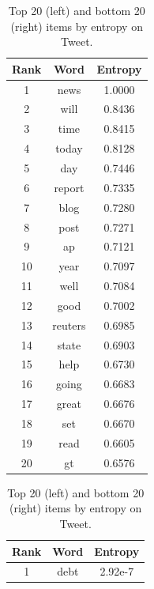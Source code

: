 \begin{table}[htbp]
\caption{Top 20 (left) and bottom 20 (right) items by entropy on Tweet.}
\begin{minipage}{0.45\linewidth}
    \centering
    \renewcommand{\arraystretch}{1.1} %
    \setlength{\tabcolsep}{7pt} %
    \label{tab:top20}
    \begin{tabular}{ccc}
    \toprule
    \textbf{Rank} & \textbf{Word} & \textbf{Entropy} \\
    \midrule
    1  & news     & 1.0000 \\
    2  & will     & 0.8436 \\
    3  & time     & 0.8415 \\
    4  & today    & 0.8128 \\
    5  & day      & 0.7446 \\
    6  & report   & 0.7335 \\
    7  & blog     & 0.7280 \\
    8  & post     & 0.7271 \\
    9  & ap       & 0.7121 \\
    10 & year     & 0.7097 \\
    11 & well     & 0.7084 \\
    12 & good     & 0.7002 \\
    13 & reuters  & 0.6985 \\
    14 & state    & 0.6903 \\
    15 & help     & 0.6730 \\
    16 & going    & 0.6683 \\
    17 & great    & 0.6676 \\
    18 & set      & 0.6670 \\
    19 & read     & 0.6605 \\
    20 & gt       & 0.6576 \\
    \bottomrule
    \end{tabular}
\end{minipage}
\hspace{0.4cm}
\begin{minipage}{0.45\linewidth}
    \centering
    \renewcommand{\arraystretch}{1.1} %
    \setlength{\tabcolsep}{7pt} %
    \label{tab:bottom20}
    \begin{tabular}{ccc}
    \toprule
    \textbf{Rank} & \textbf{Word} & \textbf{Entropy} \\
    \midrule
    1  & debt        & 2.92e-7 \\

\end{tabular}
\end{minipage}
\end{table}
